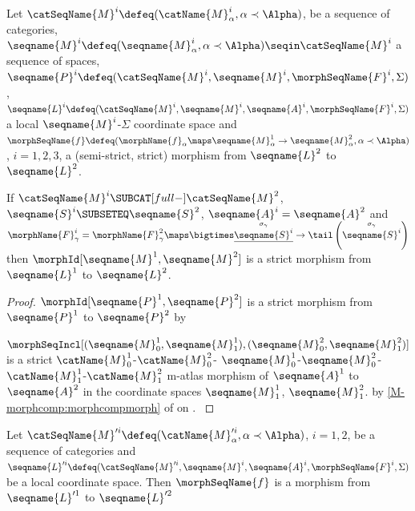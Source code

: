 \documentclass{article}
\begin{document}
\begin{lemma}
\label{lem:LCSmorph}
Let
$\catSeqName{M}^i \defeq (\catName{M}^i_\alpha, \alpha \prec \Alpha)$,
 be a sequence of categories,
$
  \seqname{M}^i \defeq (\seqname{M}^i_\alpha, \alpha \prec \Alpha)
  \seqin \catSeqName{M}^i
$
a sequence of spaces, \\
$
  \seqname{P}^i \defeq
  (
    \catSeqName{M}^i,
    \seqname{M}^i,
    \morphSeqName{F}^i,
    \Sigma
  )
$,
$
  \seqname{L}^i \defeq
  (
    \catSeqName{M}^i,
    \seqname{M}^i,
    \seqname{A}^i,
    \morphSeqName{F}^i,
    \Sigma
  )
$
a local $\seqname{M}^i$-$\Sigma$ coordinate space
and
$
  \morphSeqName{f} \defeq
    (
      \morphName{f}_\alpha \maps
        \seqname{M}^1_\alpha \to \seqname{M}^2_\alpha,
      \alpha \prec \Alpha
    )
$,
$i=1,2,3$,
a (semi-strict, strict) morphism from $\seqname{L}^2$ to
$\seqname{L}^2$.

If $\catSeqName{M}^i \SUBCAT[full-] \catSeqName{M}^2$,
$\seqname{S}^i \SUBSETEQ \seqname{S}^2$,
$\seqname{A}^i = \seqname{A}^2$ and
$
  \morphName{F}^i_\gamma = \\
  \morphName{F}^2_\gamma \maps
    \bigtimes \underline{\overset{\sigma_\gamma}{\seqname{S}^i}} \to
    \tail \left ( \overset{\sigma_\gamma}{\seqname{S}^i} \right )
$
then
$\morphId[{\seqname{M}^1,\seqname{M}^2}]$ is a strict morphism from
$\seqname{L}^1$ to $\seqname{L}^2$.

\begin{proof}
$\morphId[{\seqname{P}^1,\seqname{P}^2}]$ is a strict morphism from
$\seqname{P}^1$ to $\seqname{P}^2$
by 

$
\morphSeqIncl%
  [
    {(\seqname{M}^1_0,\seqname{M}^1_1)},
    {(\seqname{M}^2_0,\seqname{M}^2_1)}
  ]
$
is a strict
$\catName{M}^1_0$-$\catName{M}^2_0$-%
$\seqname{M}^1_0$-$\seqname{M}^2_0$-%
$\catName{M}^1_1$-$\catName{M}^2_1$ m-atlas morphism of
$\seqname{A}^1$ to $\seqname{A}^2$ in the coordinate spaces
$\seqname{M}^1_1$, $\seqname{M}^2_1$.
by
\cref{M-morphcomp:morphcompmorph} of
{
  \showlabelsinline
   on
  .
}
\end{proof}

Let
$\catSeqName{M}'^i \defeq (\catName{M}'^i_\alpha, \alpha \prec \Alpha)$,
$i=1,2$, be a sequence of categories and \\
\nobreaks
  {{
    $
      \seqname{L}'^i \defeq
      (
        \catSeqName{M}'^i,
        \seqname{M}^i,
        \seqname{A}^i,
        \morphSeqName{F}^i,
        \Sigma
      )
    $
 }}
be a local coordinate space. Then $\morphSeqName{f}$ is a morphism from
$\seqname{L}'^1$ to $\seqname{L}'^2$


\end{lemma}
\end{document}
